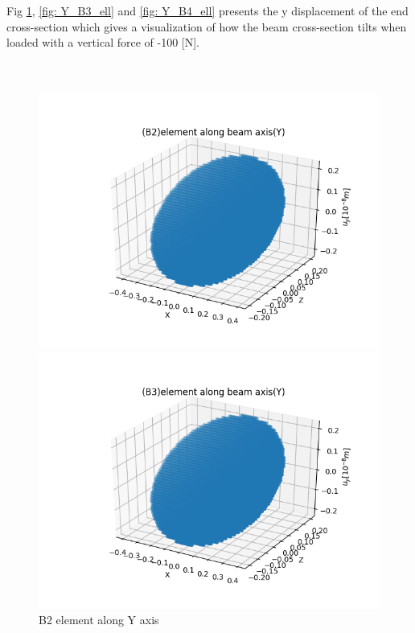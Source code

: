 \documentclass[a4paper,12pt]{article}
\begin{document}
Fig \ref{fig: Y_B2_ell}, \ref{fig: Y_B3_ell} and \ref{fig: Y_B4_ell} presents the y displacement of the end cross-section which gives a visualization of how the beam cross-section tilts when loaded with a vertical force of -100 [N].
\\
\\ 
\\
\begin{figure}[!htbp]
  \centering
  \begin{minipage}[b]{0.49\textwidth}
    \includegraphics[width=\textwidth]{19.png}
    \caption{B2 element along Y axis}
    \label{fig: Y_B2_ell}
  \end{minipage}
  \hfill
  \begin{minipage}[b]{0.49\textwidth}
    \includegraphics[width=\textwidth]{20.png}

\end{minipage}
\end{figure}
\end{document}
